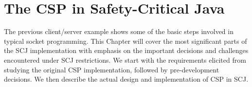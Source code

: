 \chapter{The CSP in Safety-Critical Java}
\label{chapter:cspinscj}
The previous client/server example shows some of the basic steps involved in typical socket programming. This Chapter will cover the most significant parts of the SCJ implementation with emphasis on the important decisions and challenges encountered under SCJ restrictions. We start with the requirements elicited from studying the original CSP implementation, followed by pre-development decisions. We then describe the actual design and implementation of CSP in SCJ.